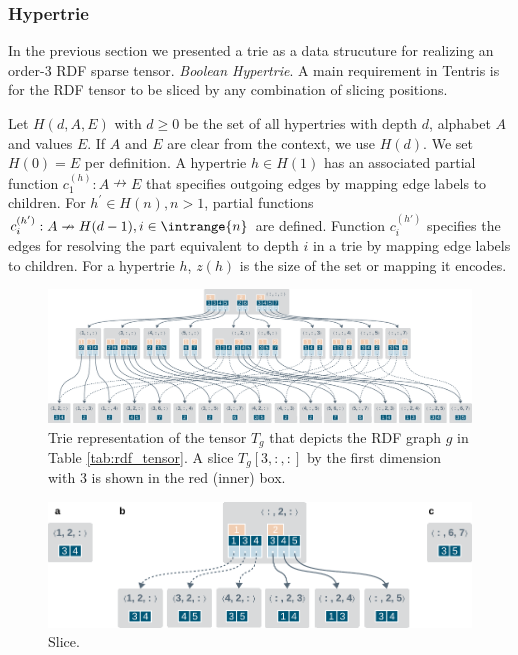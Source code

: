 \subsubsection{Hypertrie}
In the previous section we presented a trie as a data strucuture for realizing an order-3 RDF sparse tensor. 
\textit{Boolean Hypertrie}.
 A main requirement in Tentris is for the RDF tensor to be sliced by any combination of slicing positions. \\

\begin{definition}
	\label{def:bht}
	Let $H(d, A, E)$ with $d \geq 0$ be the set of all hypertries with depth $d$, alphabet $A$ and values $E$.
	If $A$ and $E$ are clear from the context, we use $H(d)$.
	We set $H(0) = E$ per definition. 
	A hypertrie $h\in H(1)$ has an associated partial function $c^{(h)}_1: A\nrightarrow E$ that specifies outgoing edges by mapping edge labels to children.
	For $ h^{'} \in H(n), n>1 $, partial functions $c^{(h')}_i: A\nrightarrow H(d-1), i \in \intrange{n}$ are defined.
	Function $c^{(h')}_i$ specifies the edges for resolving the part equivalent to depth $i$ in a trie by mapping edge labels to children.
	For a hypertrie $h$, $z(h)$ is the size of the set or mapping it encodes.
\end{definition}


\clearpage

\begin{figure}
		\centering
		\includegraphics[scale=0.78]{figures/chapter2/hypertrie4}
		\caption{Trie representation of the tensor $T_g$ that depicts the RDF graph $g$ in  Table \ref{tab:rdf_tensor}. A slice $T_g[3, :, :]$ by the first dimension with 3 is shown in the red (inner) box.}
		\label{fig:rdf_hypertrie}
\end{figure}

\begin{figure}[h]
	\centering
	\includegraphics{figures/chapter2/hypertrie4_slices}
	\caption{Slice.}
	\label{fig:rdf_hypertrie_slice}
\end{figure}
\clearpage